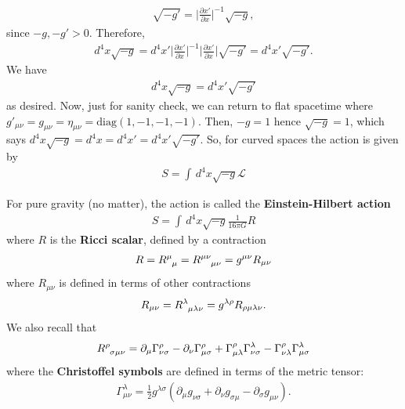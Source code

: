 \documentclass[a4paper,11pt]{article}
\numberwithin{equation}{section}
\theoremstyle{definition}
\newcommand{\p}{\partial}
\newcommand{\lag}{\mathcal{L}}
\newcommand{\f}[2]{\frac{#1}{#2}}
\newcommand{\lp}{\left(}
\newcommand{\rp}{\right)}
\begin{document}
\begin{align}
\sqrt{-g'} = \bigg\vert \f{\p x'}{\p x} \bigg\vert^{-1}\sqrt{-g},
\end{align}
since $-g, -g' > 0$. Therefore,
\begin{align}
d^4 x \sqrt{-g} = d^4 x' \bigg\vert \f{\p x'}{\p x} \bigg\vert^{-1} \bigg\vert \f{\p x'}{\p x} \bigg\vert \sqrt{-g'} = d^4 x' \sqrt{-g'}.
\end{align} 
We have 
\begin{align}
d^4x\sqrt{-g} = d^4x' \sqrt{-g'}
\end{align}
as desired. Now, just for sanity check, we can return to flat spacetime where $g'_{\mu\nu} = g_{\mu\nu} = \eta_{\mu\nu} = \text{diag}(1,-1,-1,-1)$. Then, $-g = 1$ hence $\sqrt{-g} = 1$, which says $d^4x \sqrt{-g} = d^4x = d^4x' = d^4x'\sqrt{-g'}$. So, for curved spaces the action is given by
\begin{align}
\boxed{S = \int \,d^4x \sqrt{-g}\lag}
\end{align}


For pure gravity (no matter), the action is called the \textbf{Einstein-Hilbert action}
\begin{align}
\boxed{S = \int \, d^4x \sqrt{-g}\f{1}{16\pi G}R}
\end{align}
where $R$ is the \textbf{Ricci scalar}, defined by a contraction
\begin{align}
R = \tensor{R}{^\mu_\mu} = \tensor{R}{^{\mu\nu}_{\mu\nu}} = g^{\mu\nu} R_{\mu\nu} 
\end{align}
where $R_{\mu\nu}$ is defined in terms of other contractions
\begin{align}
R_{\mu\nu} = \tensor{R}{^\lambda_{\mu\lambda\nu}} = g^{\lambda \rho} R_{\rho\mu\lambda\nu}.
\end{align}
We also recall that
\begin{align}
\tensor{R}{^\rho_{\sigma\mu\nu}} = \p_\mu \Gamma^\rho_{\nu\sigma} - \p_\nu \Gamma^\rho_{\mu\sigma} + \Gamma^\rho _{\mu\lambda}\Gamma^\lambda_{\nu\sigma} - \Gamma^\rho_{\nu\lambda} \Gamma^\lambda_{\mu\sigma}
\end{align}
where the \textbf{Christoffel symbols} are defined in terms of the metric tensor:
\begin{align}
\Gamma^\lambda_{\mu\nu} = \f{1}{2}g^{\lambda\sigma}\lp \p_\mu g_{\nu\sigma} + \p_\nu g_{\sigma\mu} - \p_\sigma g_{\mu\nu} \rp.
\end{align}
\end{document}
